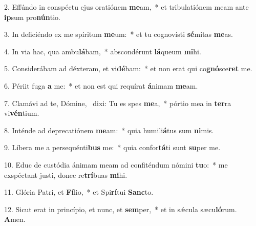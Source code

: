 2. Effúndo in conspéctu ejus oratiónem \textbf{me}am,~*  et tribulatiónem meam ante \textbf{ip}sum pro\textbf{nún}tio.\

3. In deficiéndo ex me spíritum \textbf{me}um:~*  et tu cognovísti \textbf{sé}mitas \textbf{me}as.\

4. In via hac, qua ambu\textbf{lá}bam,~*  abscondérunt \textbf{lá}queum \textbf{mi}hi.\

5. Considerábam ad déxteram, et vi\textbf{dé}bam:~*  et non erat qui co\textbf{gnó}sce\textbf{ret} me.\

6. Périit fuga \textbf{a} me:~*  et non est qui requírat \textbf{á}nimam \textbf{me}am.\

7. Clamávi ad te, Dómine, \dag\  dixi: Tu es spes \textbf{me}a,~*  pórtio mea in \textbf{ter}ra vi\textbf{vén}tium.\

8. Inténde ad deprecatiónem \textbf{me}am:~*  quia humili\textbf{á}tus sum \textbf{ni}mis.\

9. Líbera me a persequénti\textbf{bus} me:~*  quia confor\textbf{tá}ti sunt \textbf{su}per me.\

10. Educ de custódia ánimam meam ad confiténdum nómini \textbf{tu}o:~*  me exspéctant justi, donec re\textbf{trí}buas \textbf{mi}hi.\

11. Glória Patri, et \textbf{Fí}lio,~*  et Spi\textbf{rí}tui \textbf{Sanc}to.\

12. Sicut erat in princípio, et nunc, et \textbf{sem}per,~*  et in sǽcula sæcu\textbf{ló}rum. \textbf{A}men.\

